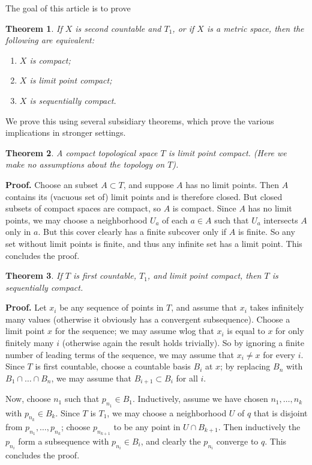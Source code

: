 \documentclass[12pt]{article}
\newtheorem{thm}{Theorem}
\begin{document}
The goal of this article is to prove
\begin{thm} If $X$ is second countable and $T_1$, or if $X$ is a metric space, then the following are equivalent:
\begin{enumerate}
\item $X$ is compact;
\item $X$ is limit point compact;
\item $X$ is sequentially compact.
\end{enumerate}
\end{thm}
We prove this using several subsidiary theorems, which prove the various implications in stronger settings.

\begin{thm} A compact topological space $T$ is limit point compact. (Here we make no assumptions about the topology on $T$).
\end{thm}
\textbf{Proof. } 
Choose an subset $A\subset T$, and suppose $A$ has no limit points. Then $A$ contains its (vacuous set of) limit points and is therefore closed. But closed subsets of compact spaces are compact, so $A$ is compact. Since $A$ has no limit points, we may choose a neighborhood $U_a$ of each $a\in A$ such that $U_a$ intersects $A$ only in $a$. But this cover clearly has a finite subcover only if $A$ is finite. So any set without limit points is finite, and thus any infinite set has a limit point. This concludes the proof.


\begin{thm} If $T$ is first countable, $T_1$, and limit point compact, then $T$ is sequentially compact.
\end{thm}

\textbf{Proof. }
Let $x_i$ be any sequence of points in $T$, and assume that $x_i$ takes infinitely many values (otherwise it obviously has a convergent subsequence). Choose a limit point $x$ for the sequence; we may assume wlog that $x_i$ is equal to $x$ for only finitely many $i$ (otherwise again the result holds trivially). So by ignoring a finite number of leading terms of the sequence, we may assume that $x_i\neq x$ for every $i$. Since $T$ is first countable, choose a countable basis $B_i$ at $x$; by replacing $B_n$ with $B_1\cap\ldots\cap B_n$, we may assume that $B_{i+1}\subset B_i$ for all $i$.

Now, choose $n_1$ such that $p_{n_1}\in B_1$. Inductively, assume we have chosen $n_1,\ldots,n_k$ with $p_{n_k}\in B_k$. Since $T$ is $T_1$, we may choose a neighborhood $U$ of $q$ that is disjoint from $p_{n_1},\ldots,p_{n_k}$; choose $p_{n_{k+1}}$ to be any point in $U\cap B_{k+1}$. Then inductively the $p_{n_i}$ form a subsequence with $p_{n_i}\in B_i$, and clearly the $p_{n_i}$ converge to $q$. This concludes the proof.
\end{document}
